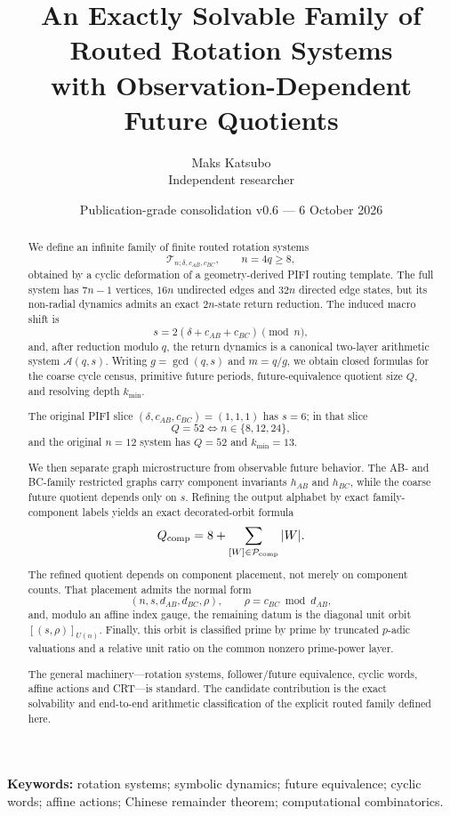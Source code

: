 \documentclass[11pt,a4paper]{article}
\title{An Exactly Solvable Family of Routed Rotation Systems\\
with Observation-Dependent Future Quotients}
\author{Maks Katsubo\\Independent researcher}
\date{Publication-grade consolidation v0.6 --- 6 October 2026}
\theoremstyle{definition}
\providecommand{\T}{}
\renewcommand{\T}{\mathcal T}
\providecommand{\A}{}
\renewcommand{\A}{\mathcal A}
\newcommand{\Pcomp}{\mathcal P_{\rm comp}}
\begin{document}
\maketitle

\begin{abstract}
We define an infinite family of finite routed rotation systems
\[
\T_{n;\delta,c_{AB},c_{BC}},\qquad n=4q\ge 8,
\]
obtained by a cyclic deformation of a geometry-derived PIFI routing template.
The full system has \(7n-1\) vertices, \(16n\) undirected edges and \(32n\) directed edge states, but its non-radial dynamics admits an exact \(2n\)-state return reduction.
The induced macro shift is
\[
s=2(\delta+c_{AB}+c_{BC})\pmod n,
\]
and, after reduction modulo \(q\), the return dynamics is a canonical two-layer arithmetic system \(\A(q,s)\).
Writing \(g=\gcd(q,s)\) and \(m=q/g\), we obtain closed formulas for the coarse cycle census, primitive future periods, future-equivalence quotient size \(Q\), and resolving depth \(k_{\min}\).

The original PIFI slice \((\delta,c_{AB},c_{BC})=(1,1,1)\) has \(s=6\); in that slice
\[
Q=52\iff n\in\{8,12,24\},
\]
and the original \(n=12\) system has \(Q=52\) and \(k_{\min}=13\).

We then separate graph microstructure from observable future behavior.
The AB- and BC-family restricted graphs carry component invariants \(h_{AB}\) and \(h_{BC}\), while the coarse future quotient depends only on \(s\).
Refining the output alphabet by exact family-component labels yields an exact decorated-orbit formula
\[
Q_{\rm comp}
=
8+\sum_{[W]\in\Pcomp}|W|.
\]
The refined quotient depends on component placement, not merely on component counts.
That placement admits the normal form
\[
(n,s,d_{AB},d_{BC},\rho),\qquad \rho=c_{BC}\bmod d_{AB},
\]
and, modulo an affine index gauge, the remaining datum is the diagonal unit orbit
\(
[(s,\rho)]_{U(n)}.
\)
Finally, this orbit is classified prime by prime by truncated \(p\)-adic valuations and a relative unit ratio on the common nonzero prime-power layer.

The general machinery---rotation systems, follower/future equivalence, cyclic words, affine actions and CRT---is standard.
The candidate contribution is the exact solvability and end-to-end arithmetic classification of the explicit routed family defined here.
\end{abstract}

\medskip
\noindent\textbf{Keywords:}
rotation systems; symbolic dynamics; future equivalence; cyclic words; affine actions; Chinese remainder theorem; computational combinatorics.
\end{document}
